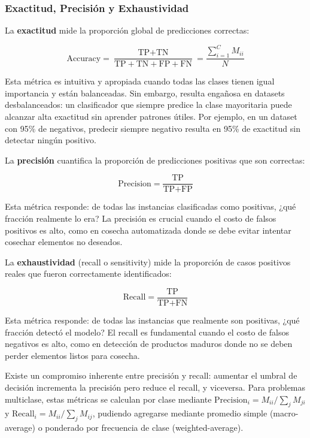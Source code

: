 \subsubsection{Exactitud, Precisión y Exhaustividad}

La \textbf{exactitud} mide la proporción global de predicciones correctas:

\begin{equation}
\text{Accuracy} = \frac{\text{TP} + \text{TN}}{\text{TP} + \text{TN} + \text{FP} + \text{FN}} = \frac{\sum_{i=1}^{C} M_{ii}}{N}
\end{equation}

Esta métrica es intuitiva y apropiada cuando todas las clases tienen igual importancia y están balanceadas. Sin embargo, resulta engañosa en datasets desbalanceados: un clasificador que siempre predice la clase mayoritaria puede alcanzar alta exactitud sin aprender patrones útiles. Por ejemplo, en un dataset con 95\% de negativos, predecir siempre negativo resulta en 95\% de exactitud sin detectar ningún positivo.

La \textbf{precisión} cuantifica la proporción de predicciones positivas que son correctas:

\begin{equation}
\text{Precision} = \frac{\text{TP}}{\text{TP} + \text{FP}}
\end{equation}

Esta métrica responde: de todas las instancias clasificadas como positivas, ¿qué fracción realmente lo era? La precisión es crucial cuando el costo de falsos positivos es alto, como en cosecha automatizada donde se debe evitar intentar cosechar elementos no deseados.

La \textbf{exhaustividad} (recall o sensitivity) mide la proporción de casos positivos reales que fueron correctamente identificados:

\begin{equation}
\text{Recall} = \frac{\text{TP}}{\text{TP} + \text{FN}}
\end{equation}

Esta métrica responde: de todas las instancias que realmente son positivas, ¿qué fracción detectó el modelo? El recall es fundamental cuando el costo de falsos negativos es alto, como en detección de productos maduros donde no se deben perder elementos listos para cosecha.

Existe un compromiso inherente entre precisión y recall: aumentar el umbral de decisión incrementa la precisión pero reduce el recall, y viceversa. Para problemas multiclase, estas métricas se calculan por clase mediante $\text{Precision}_i = M_{ii}/\sum_{j} M_{ji}$ y $\text{Recall}_i = M_{ii}/\sum_{j} M_{ij}$, pudiendo agregarse mediante promedio simple (macro-average) o ponderado por frecuencia de clase (weighted-average).

